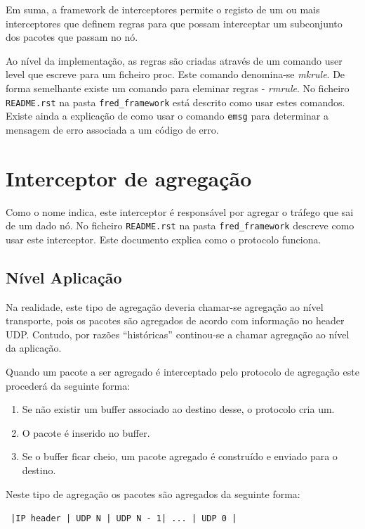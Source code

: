 \documentclass[10pt,a4paper,oneside]{book}
\begin{document}
  Em suma, a framework de interceptores permite o registo de um ou mais interceptores que definem regras para que possam interceptar um subconjunto dos pacotes que passam no nó.

  Ao nível da implementação, as regras são criadas através de um comando user level que escreve para um ficheiro proc. Este comando denomina-se \emph{mkrule}. De forma semelhante existe um comando para eleminar regras - \emph{rmrule}. No ficheiro {\tt README.rst} na pasta {\tt fred\_framework} está descrito como usar estes comandos. Existe ainda a explicação de como usar o comando {\tt emsg} para determinar a mensagem de erro associada a um código de erro.
  
  \section{Interceptor de agregação} 

   Como o nome indica, este interceptor é responsável por agregar o tráfego que sai de um dado nó. No ficheiro {\tt README.rst} na pasta {\tt fred\_framework} descreve como usar este interceptor. Este documento explica como o protocolo funciona.

   \subsection{Nível Aplicação}
   
    Na realidade, este tipo de agregação deveria chamar-se agregação ao nível transporte, pois os pacotes são agregados de acordo com informação no header UDP. Contudo, por razões ``históricas'' continou-se a chamar agregação ao nível da aplicação.

    Quando um pacote a ser agregado é interceptado pelo protocolo de agregação este procederá da seguinte forma: 

    \begin{enumerate}
      \item Se não existir um buffer associado ao destino desse, o protocolo cria um.
      \item O pacote é inserido no buffer.
      \item Se o buffer ficar cheio, um pacote agregado é construído e enviado para o destino.
    \end{enumerate}

    Neste tipo de agregação os pacotes são agregados da seguinte forma:

    {\tt
      |IP header | UDP N | UDP N - 1| ... | UDP 0 |
    }
\end{document}
